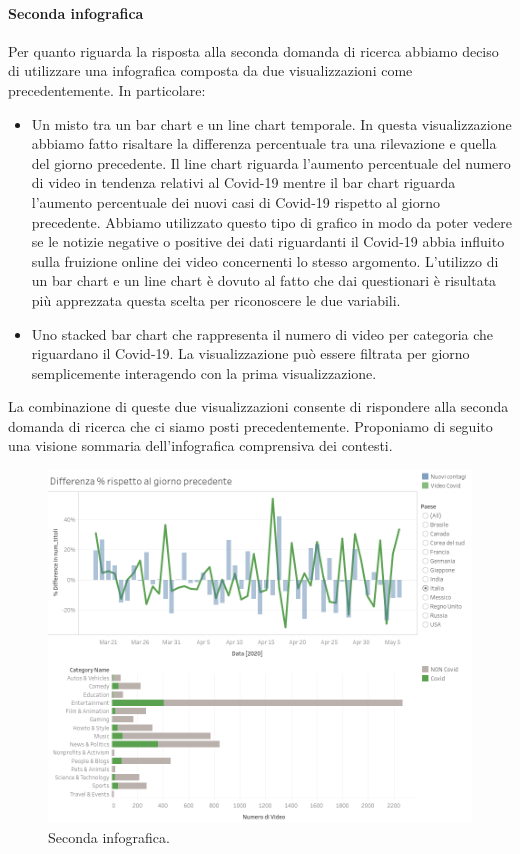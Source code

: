 \documentclass[10pt, a4paper,openany]{article}
\begin{document}
\paragraph{Seconda infografica} Per quanto riguarda la risposta alla seconda domanda di ricerca abbiamo deciso di utilizzare una infografica composta da due visualizzazioni come precedentemente. In particolare:
\begin{itemize}
	\item Un misto tra un bar chart e un line chart temporale. In questa visualizzazione abbiamo fatto risaltare la differenza percentuale tra una rilevazione e quella del giorno precedente. Il line chart riguarda l'aumento percentuale del numero di video in tendenza relativi al Covid-19 mentre il bar chart riguarda l'aumento percentuale dei nuovi casi di Covid-19 rispetto al giorno precedente. 
	Abbiamo utilizzato questo tipo di grafico in modo da poter vedere se le notizie negative o positive dei dati riguardanti il Covid-19 abbia influito sulla fruizione online dei video concernenti lo stesso argomento.
	L'utilizzo di un bar chart e un line chart è dovuto al fatto che dai questionari è risultata più apprezzata questa scelta per riconoscere le due variabili.

	\item Uno stacked bar chart che rappresenta il numero di video per categoria che riguardano il Covid-19. La visualizzazione può essere filtrata per giorno semplicemente interagendo con la prima visualizzazione.
\end{itemize}

La combinazione di queste due visualizzazioni consente di rispondere alla seconda domanda di ricerca che ci siamo posti precedentemente. Proponiamo di seguito una visione sommaria dell'infografica comprensiva dei contesti.

\begin{figure}[H]
	\centering
	\includegraphics[height=0.5 \linewidth]{pics/seconda_infografica.png}
	\caption{Seconda infografica.}
\end{figure}
\end{document}
